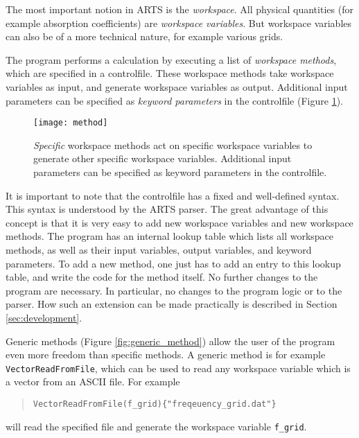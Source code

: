 \label{sec:concept:arts}

The most important notion in ARTS is the \emph{workspace}. All
physical quantities (for example absorption coefficients) are
\emph{workspace variables}. But workspace variables can also be of
a more technical nature, for example various grids. 

The program performs a calculation by executing a list of
\emph{workspace methods}, which are specified in a
controlfile. These workspace methods take workspace variables as
input, and generate workspace variables as output. Additional
input parameters can be specified as \emph{keyword parameters} in
the controlfile (Figure \ref{fig:method}).

\begin{figure}
  \begin{center}
    \texttt{[image: method]}
    \caption{\emph{Specific}
        workspace methods act on specific workspace variables to
        generate other specific workspace variables. Additional input
        parameters can be specified as keyword parameters in the
        controlfile.}
    \label{fig:method}
  \end{center}
\end{figure}

It is important to note that the controlfile has a fixed and
well-defined syntax. This syntax is understood by the ARTS parser.
The great advantage of this concept is that it is very easy to add
new workspace variables and new workspace methods. The program has
an internal lookup table which lists all workspace methods, as well
as their input variables, output variables, and keyword
parameters. To add a new method, one just has to add an entry to
this lookup table, and write the code for the method itself. No
further changes to the program are necessary. In particular, no
changes to the program logic or to the parser. How such an extension
can be made practically is described in Section \ref{sec:development}.


\label{sec:concept:generic}

Generic methods (Figure \ref{fig:generic_method}) allow the user of the
program even more freedom than specific methods. A generic method is
for example \verb|VectorReadFromFile|, which can be used to read any
workspace variable which is a vector from an ASCII file. For example
\begin{quote}
  \verb|VectorReadFromFile(f_grid){"freqeuency_grid.dat"}|
\end{quote}
will read the specified file and generate the workspace variable
\verb|f_grid|.

